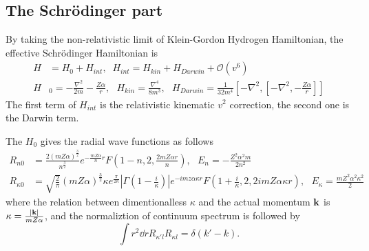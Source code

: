 \documentclass{article}
\newcommand{\vbk}{\vb{k}}
\renewcommand{\a}{\alpha}
\newcommand{\ka}{\kappa}
\begin{document}
\subsection{The Schr\"odinger part}

By taking the non-relativistic limit of Klein-Gordon Hydrogen Hamiltonian, the effective Schr\"odinger Hamiltonian is\cite{Holstein2014}
\begin{align}
	H & =H_0+H_{int} ,\;\;H_{int}=H_{kin}+H_{Darwin}+\mathcal{O}(v^6)                                                                                                                           \\
	H & _0=-\frac{\nabla^2}{2m}-\frac{Z\alpha}{r},\ \ \ H_{kin}=\frac{\nabla^4}{8m^3},\ \ \ H_{Darwin}=\frac{1}{32m^4}[-\nabla^2,[-\nabla^2,-\frac{Z\alpha}{r}]]
\end{align}
The first term of $H_{int}$ is the relativistic kinematic $v^2$ correction, the second one is the Darwin term.

The $H_0$ gives the radial wave functions as follows
\begin{align}
	R_{n0}       & =\frac{2(mZ\alpha)^\frac{3}{2}}{n^\frac{3}{2}}e^{-\frac{mZ\alpha}{n}r}F(1-n,2,\frac{2mZ\alpha r}{n}),\ \ \ E_n=-\frac{Z^2\alpha^2m}{2n^2}                                                                             \\
	R_{\kappa 0} & =\sqrt{\frac{2}{\pi}}(mZ\alpha)^\frac{3}{2}\kappa e^\frac{\pi}{2\kappa}|\Gamma(1-\frac{i}{\kappa})|e^{-imz\alpha \kappa r}F(1+\frac{i}{\kappa},2,2imZ\alpha \kappa r),\ \ \ E_{\kappa}=\frac{mZ^2\alpha^2\kappa^2}{2}
\end{align}
where the relation between dimentionalless $\ka$ and the actual momentum $\vbk$ is $\kappa=\frac{\abs{\vbk}}{m Z \a}$, and the normaliztion of continuum spectrum is followed by $$\int r^2\dd rR_{\ka' l}R_{\ka l}=\delta(k'-k).$$
\end{document}
